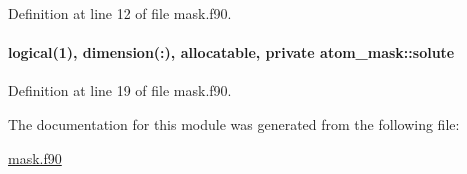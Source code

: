 Definition at line 12 of file mask.\-f90.

\hypertarget{classatom__mask_afd305ff17cef09bcbb0a2ee88bc47849}{
\paragraph[{solute}]{\setlength{\rightskip}{0pt plus 5cm}logical(1), dimension(\-:), allocatable, private atom\-\_\-mask\-::solute\hspace{0.3cm}{\ttfamily [private]}}}\label{classatom__mask_afd305ff17cef09bcbb0a2ee88bc47849}


Definition at line 19 of file mask.\-f90.



The documentation for this module was generated from the following file\-:\begin{DoxyCompactItemize}
\item 
\hyperlink{mask_8f90}{mask.\-f90}\end{DoxyCompactItemize}
